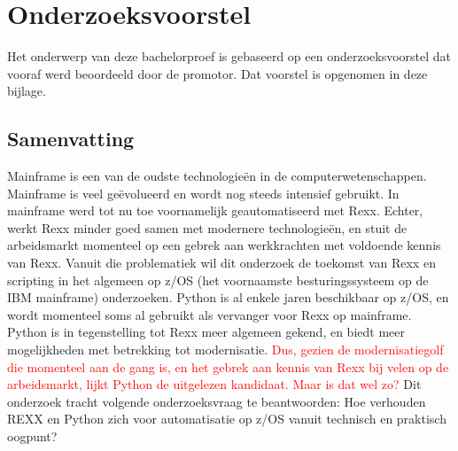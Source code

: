\documentclass[dutch,dit,thesis]{hogentreport}
\begin{document}








%




\appendix

\chapter{Onderzoeksvoorstel}

Het onderwerp van deze bachelorproef is gebaseerd op een onderzoeksvoorstel dat vooraf werd beoordeeld door de promotor. Dat voorstel is opgenomen in deze bijlage.

 
\section*{Samenvatting}

Mainframe is een van de oudste technologieën in de computerwetenschappen. Mainframe is veel geëvolueerd en wordt nog steeds intensief gebruikt. In mainframe werd tot nu toe voornamelijk geautomatiseerd met Rexx. Echter, werkt Rexx minder goed samen met modernere technologieën, en stuit de arbeidsmarkt momenteel op een gebrek aan werkkrachten met voldoende kennis van Rexx. Vanuit die problematiek wil dit onderzoek de toekomst van Rexx en scripting in het algemeen op z/OS (het voornaamste besturingssysteem op de IBM mainframe) onderzoeken. Python is al enkele jaren beschikbaar op z/OS, en wordt momenteel soms al gebruikt als vervanger voor Rexx op mainframe. Python is in tegenstelling tot Rexx meer algemeen gekend, en biedt meer mogelijkheden met betrekking tot modernisatie. \textcolor{red} {Dus, gezien de modernisatiegolf die momenteel aan de gang is, en het gebrek aan kennis van Rexx bij velen op de arbeidsmarkt, lijkt Python de uitgelezen kandidaat. Maar is dat wel zo?} Dit onderzoek tracht volgende onderzoeksvraag te beantwoorden: Hoe verhouden REXX en Python zich voor automatisatie op z/OS vanuit technisch en praktisch oogpunt?
\end{document}
